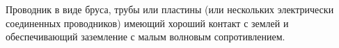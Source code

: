 Проводник в виде бруса, трубы или пластины (или нескольких
электрически соединенных проводников) имеющий хороший
контакт с землей и обеспечивающий заземление с малым
волновым сопротивлением.
